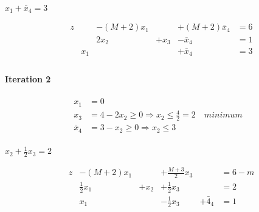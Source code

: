 \documentclass{article}
\begin{document}
$x_1 + \bar{x}_4 = 3$

\begin{equation}
  \begin{aligned}
    &z  & &-(M+2)x_1 & &+(M+2)\bar{x}_4 &= 6 \\
    & &  &2x_2 &+x_3  &-\bar{x}_4 &= 1 \\
    & &x_1 & & &+\bar{x}_4 &= 3 \\
  \end{aligned}
\end{equation}

\paragraph{Iteration 2}

\begin{equation}
  \begin{aligned}
    x_1 &= 0 \\
    x_3 &= 4 - 2x_2 \geq 0 \Rightarrow x_2 \leq \frac{4}{2} = 2 \quad minimum  \\
    \bar{x}_4 &= 3 - x_2 \geq 0 \Rightarrow x_2 \leq 3 \\
  \end{aligned}
\end{equation}

$x_2 + \frac{1}{2} x_3 = 2$

\begin{equation}
  \begin{aligned}
    &z  &-(M+2)x_1 &  &+\frac{M+3}{2}x_3 & &= 6-m \\
    & &\frac{1}{2}x_1  &+x_2 &+\frac{1}{2}x_3  & & = 2 \\
    & &x_1  & &-\frac{1}{2}x_3  &+\bar{4}_4 &= 1 \\
  \end{aligned}
\end{equation}
\end{document}
